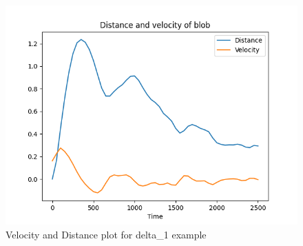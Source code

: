 \documentclass{article}
\begin{document}
\begin{arrowlist}
    \begin{figure}[H]
    \centering
        \includegraphics[height=0.5\textheight]{./Fig/Fig3 vel plot.png}
        \normalsize{\caption{Velocity and Distance plot for delta\_1 example}}
        \label{fig:fig3}
    \end{figure}   
    
\end{arrowlist}

\nocite{*}
\printbibliography[title={References}]
\end{document}

